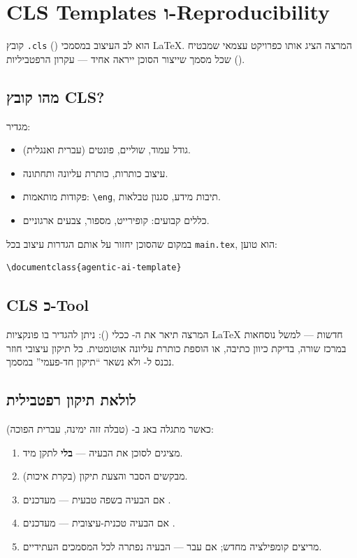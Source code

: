 \section{CLS Templates ו-Reproducibility}

קובץ \texttt{.cls} () הוא לב העיצוב במסמכי \LaTeX{}.
המרצה הציג אותו כפרויקט עצמאי שמבטיח שכל מסמך שייצור הסוכן ייראה אחיד
--- עקרון הרפטביליות ().

\subsection{מהו קובץ CLS?}

 מגדיר:
\begin{itemize}[rightmargin=2em]
  \item גודל עמוד, שוליים, פונטים (עברית ואנגלית).
  \item עיצוב כותרות, כותרת עליונה ותחתונה.
  \item פקודות מותאמות: \texttt{\textbackslash eng}, תיבות מידע, סגנון טבלאות.
  \item כללים קבועים: קופירייט, מספור, צבעים ארגוניים.
\end{itemize}

במקום שהסוכן יחזור על אותם הגדרות עיצוב בכל \texttt{main.tex}, הוא טוען:
\begin{lstlisting}
\documentclass{agentic-ai-template}
\end{lstlisting}

\subsection{CLS כ-Tool}

המרצה תיאר את ה- ככלי (): ניתן להגדיר בו פונקציות
\LaTeX{} חדשות --- למשל נוסחאות במרכז שורה, בדיקת כיוון כתיבה, או
הוספת כותרת עליונה אוטומטית. כל תיקון עיצובי חוזר נכנס ל-
ולא נשאר ``תיקון חד-פעמי'' במסמך.

\subsection{לולאת תיקון רפטבילית}

כאשר מתגלה באג ב- (טבלה זזה ימינה, עברית הפוכה):
\begin{enumerate}[rightmargin=2em]
  \item מציגים לסוכן את הבעיה --- \textbf{בלי} לתקן מיד.
  \item מבקשים הסבר והצעת תיקון (בקרת איכות).
  \item אם הבעיה בשפה טבעית --- מעדכנים .
  \item אם הבעיה טכנית-עיצובית --- מעדכנים .
  \item מריצים קומפילציה מחדש; אם עבר --- הבעיה נפתרה לכל המסמכים העתידיים.
\end{enumerate}

